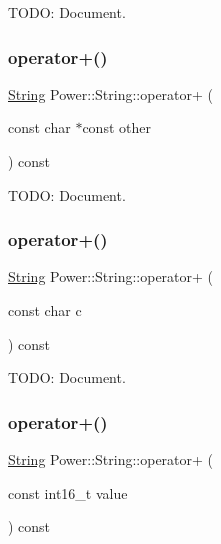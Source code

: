 T\+O\+DO\+: Document. 

\mbox{\label{class_power_1_1_string_af34ca6369790db392b8a39e2149e5201}} 
\subsubsection{\texorpdfstring{operator+()}{operator+()}\hspace{0.1cm}{\footnotesize\ttfamily [2/11]}}
{\footnotesize\ttfamily \hyperlink{class_power_1_1_string}{String} Power\+::\+String\+::operator+ (\begin{DoxyParamCaption}\item[{const char $\ast$const}]{other }\end{DoxyParamCaption}) const\hspace{0.3cm}{\ttfamily [inline]}}



T\+O\+DO\+: Document. 

\mbox{\label{class_power_1_1_string_ada2da9028cb2a4ebffc585a1da8a942f}} 
\subsubsection{\texorpdfstring{operator+()}{operator+()}\hspace{0.1cm}{\footnotesize\ttfamily [3/11]}}
{\footnotesize\ttfamily \hyperlink{class_power_1_1_string}{String} Power\+::\+String\+::operator+ (\begin{DoxyParamCaption}\item[{const char}]{c }\end{DoxyParamCaption}) const\hspace{0.3cm}{\ttfamily [inline]}}



T\+O\+DO\+: Document. 

\mbox{\label{class_power_1_1_string_ad650c3d76fd2ff718f2ee0dd6b9945de}} 
\subsubsection{\texorpdfstring{operator+()}{operator+()}\hspace{0.1cm}{\footnotesize\ttfamily [4/11]}}
{\footnotesize\ttfamily \hyperlink{class_power_1_1_string}{String} Power\+::\+String\+::operator+ (\begin{DoxyParamCaption}\item[{const int16\+\_\+t}]{value }\end{DoxyParamCaption}) const\hspace{0.3cm}{\ttfamily [inline]}}



